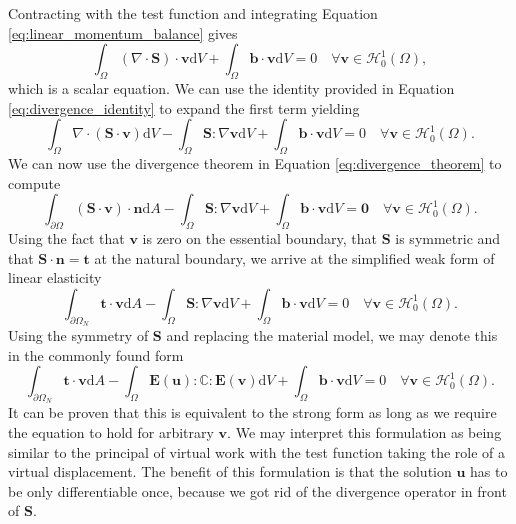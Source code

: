 Contracting with the test function and integrating Equation \eqref{eq:linear_momentum_balance} gives
\begin{equation}
    \int_\Omega (\nabla \cdot \mathbf{S}) \cdot \mathbf{v} \text{d}V
    + \int_\Omega \mathbf{b} \cdot \mathbf{v} \text{d}V = 0 \quad \forall \mathbf{v} \in \mathcal{H}^1_0 (\Omega),
    \label{eq:weak_form_raw}
\end{equation}
which is a scalar equation. We can use the identity provided in Equation \eqref{eq:divergence_identity} to expand the first term yielding
\begin{equation}
    \int_\Omega \nabla \cdot (\mathbf{S} \cdot \mathbf{v}) \text{d}V
    - \int_\Omega \mathbf{S} : \nabla \mathbf{v} \text{d}V
    + \int_\Omega \mathbf{b} \cdot \mathbf{v} \text{d}V = 0 \quad \forall \mathbf{v} \in \mathcal{H}^1_0 (\Omega).
\end{equation}
We can now use the divergence theorem in Equation \eqref{eq:divergence_theorem} to compute 
\begin{equation}
    \int_{\partial \Omega} (\mathbf{S} \cdot \mathbf{v}) \cdot \mathbf{n} \text{d}A
    - \int_\Omega \mathbf{S} : \nabla \mathbf{v} \text{d}V
    + \int_\Omega \mathbf{b} \cdot \mathbf{v} \text{d}V = \mathbf{0} \quad \forall \mathbf{v} \in \mathcal{H}^1_0 (\Omega).
\end{equation}
Using the fact that $\mathbf{v}$ is zero on the essential boundary, that $\mathbf{S}$ is symmetric and that $\mathbf{S}\cdot \mathbf{n} = \mathbf{t}$ at the natural boundary, we arrive at the simplified weak form of linear elasticity 
\begin{equation}
    \int_{\partial \Omega_N} \mathbf{t} \cdot \mathbf{v} \text{d}A
    - \int_\Omega \mathbf{S} : \nabla \mathbf{v} \text{d}V
    + \int_\Omega \mathbf{b} \cdot \mathbf{v} \text{d}V = 0 \quad \forall \mathbf{v} \in \mathcal{H}^1_0 (\Omega).
\end{equation}
Using the symmetry of $\mathbf{S}$ and replacing the material model, we may denote this in the commonly found form
\begin{equation}
    \int_{\partial \Omega_N} \mathbf{t} \cdot \mathbf{v} \text{d}A
    - \int_\Omega \mathbf{E}(\mathbf{u}) : \mathbb{C} :  \mathbf{E}(\mathbf{v}) \text{d}V
    + \int_\Omega \mathbf{b} \cdot \mathbf{v} \text{d}V = 0 \quad \forall \mathbf{v} \in \mathcal{H}^1_0 (\Omega).
\end{equation}
It can be proven that this is equivalent to the strong form as long as we require the equation to hold for arbitrary $\mathbf{v}$. We may interpret this formulation as being similar to the principal of virtual work with the test function taking the role of a virtual displacement.
The benefit of this formulation is that the solution $\mathbf{u}$ has to be only differentiable once, because we got rid of the divergence operator in front of $\mathbf{S}$.


